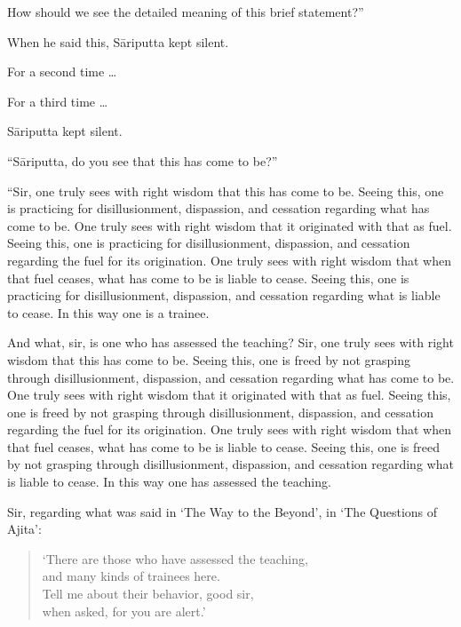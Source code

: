 \documentclass[12pt,openany]{book}%
\begin{document}
How should we see the detailed meaning of this brief statement?” 

When he said this, \textsanskrit{Sāriputta} kept silent. 

For a second time … 

For a third time … 

\textsanskrit{Sāriputta} kept silent. 

“\textsanskrit{Sāriputta}, do you see that this has come to be?” 

“Sir, one truly sees with right wisdom that this has come to be. Seeing this, one is practicing for disillusionment, dispassion, and cessation regarding what has come to be. One truly sees with right wisdom that it originated with that as fuel. Seeing this, one is practicing for disillusionment, dispassion, and cessation regarding the fuel for its origination. One truly sees with right wisdom that when that fuel ceases, what has come to be is liable to cease. Seeing this, one is practicing for disillusionment, dispassion, and cessation regarding what is liable to cease. In this way one is a trainee. 

And what, sir, is one who has assessed the teaching? Sir, one truly sees with right wisdom that this has come to be. Seeing this, one is freed by not grasping through disillusionment, dispassion, and cessation regarding what has come to be. One truly sees with right wisdom that it originated with that as fuel. Seeing this, one is freed by not grasping through disillusionment, dispassion, and cessation regarding the fuel for its origination. One truly sees with right wisdom that when that fuel ceases, what has come to be is liable to cease. Seeing this, one is freed by not grasping through disillusionment, dispassion, and cessation regarding what is liable to cease. In this way one has assessed the teaching. 

Sir, regarding what was said in ‘The Way to the Beyond’, in ‘The Questions of Ajita’: 

\begin{verse}%
‘There are those who have assessed the teaching, \\
and many kinds of trainees here. \\
Tell me about their behavior, good sir, \\
when asked, for you are alert.’ 

%
\end{verse}
\end{document}
